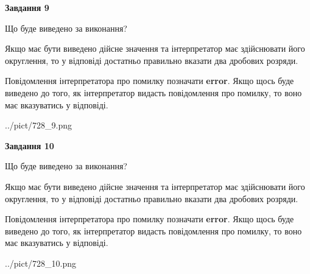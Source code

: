 \documentclass[12pt, ukrainian]{article}
\begin{document}
{\begin {Large}
{\begin {center}\textbf{Завдання 9}\end {center}}\par
Що буде виведено за виконання? \par

Якщо має бути виведено дійсне значення та інтерпретатор має здійснювати його округлення, 
то у відповіді достатньо правильно вказати два дробових розряди.

Повідомлення інтерпретатора про помилку позначати \textbf{error}.
Якщо щось буде виведено до того, як інтерпретатор видасть повідомлення про помилку, 
то воно має вказуватись у відповіді. \par

\begin{center}
	{../pict/728_9.png}
\end{center}
\newpage

{\begin {center}\textbf{Завдання 10}\end {center}}\par
Що буде виведено за виконання? \par

Якщо має бути виведено дійсне значення та інтерпретатор має здійснювати його округлення, 
то у відповіді достатньо правильно вказати два дробових розряди.

Повідомлення інтерпретатора про помилку позначати \textbf{error}.
Якщо щось буде виведено до того, як інтерпретатор видасть повідомлення про помилку, 
то воно має вказуватись у відповіді. \par

\begin{center}
	{../pict/728_10.png}
\end{center}
\newpage

\end {Large}}
\end{document}
